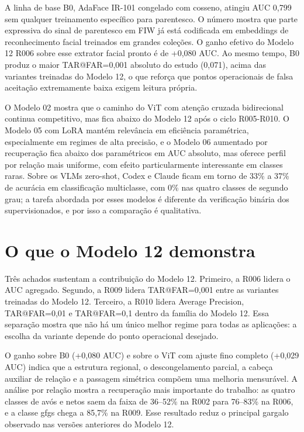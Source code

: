 A linha de base B0, AdaFace IR-101 congelado com cosseno, atingiu AUC 0,799 sem qualquer treinamento específico para parentesco. O número mostra que parte expressiva do sinal de parentesco em FIW já está codificada em embeddings de reconhecimento facial treinados em grandes coleções. O ganho efetivo do Modelo 12 R006 sobre esse extrator facial pronto é de +0,080 AUC. Ao mesmo tempo, B0 produz o maior TAR@FAR=0,001 absoluto do estudo (0,071), acima das variantes treinadas do Modelo 12, o que reforça que pontos operacionais de falsa aceitação extremamente baixa exigem leitura própria.

O Modelo 02 mostra que o caminho do ViT com atenção cruzada bidirecional continua competitivo, mas fica abaixo do Modelo 12 após o ciclo R005-R010. O Modelo 05 com LoRA mantém relevância em eficiência paramétrica, especialmente em regimes de alta precisão, e o Modelo 06 aumentado por recuperação fica abaixo dos paramétricos em AUC absoluto, mas oferece perfil por relação mais uniforme, com efeito particularmente interessante em classes raras. Sobre os VLMs zero-shot, Codex e Claude ficam em torno de 33\% a 37\% de acurácia em classificação multiclasse, com 0\% nas quatro classes de segundo grau; a tarefa abordada por esses modelos é diferente da verificação binária dos supervisionados, e por isso a comparação é qualitativa.

\section{O que o Modelo 12 demonstra}

Três achados sustentam a contribuição do Modelo 12. Primeiro, a R006 lidera o AUC agregado. Segundo, a R009 lidera TAR@FAR=0,001 entre as variantes treinadas do Modelo 12. Terceiro, a R010 lidera Average Precision, TAR@FAR=0,01 e TAR@FAR=0,1 dentro da família do Modelo 12. Essa separação mostra que não há um único melhor regime para todas as aplicações: a escolha da variante depende do ponto operacional desejado.

O ganho sobre B0 (+0,080 AUC) e sobre o ViT com ajuste fino completo (+0,029 AUC) indica que a estrutura regional, o descongelamento parcial, a cabeça auxiliar de relação e a passagem simétrica compõem uma melhoria mensurável. A análise por relação mostra a recuperação mais importante do trabalho: as quatro classes de avós e netos saem da faixa de 36--52\% na R002 para 76--83\% na R006, e a classe gfgs chega a 85{,}7\% na R009. Esse resultado reduz o principal gargalo observado nas versões anteriores do Modelo 12.

